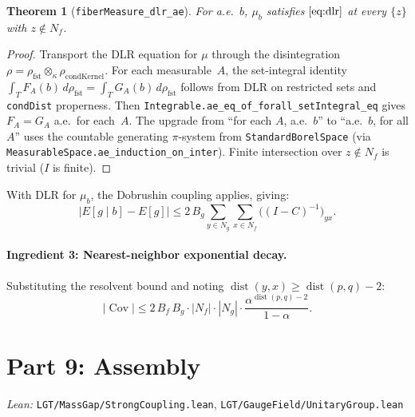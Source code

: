 \documentclass[11pt,a4paper]{article}
\newtheorem{theorem}{Theorem}
\theoremstyle{definition}
\newcommand{\Cov}{\operatorname{Cov}}
\begin{document}
\begin{theorem}[\texttt{fiberMeasure\_dlr\_ae}]
For a.e.\ $b$, $\mu_b$ satisfies $\eqref{eq:dlr}$ at every
$\{z\}$ with $z \notin N_f$.
\end{theorem}
\begin{proof}
Transport the DLR equation for $\mu$ through the disintegration
$\rho = \rho_\text{fst} \otimes_\kappa \rho_\text{condKernel}$.
For each measurable~$A$, the set-integral identity
$\int_T F_A(b)\, d\rho_\text{fst} = \int_T G_A(b)\, d\rho_\text{fst}$
follows from DLR on restricted sets and \texttt{condDist}
properness. Then
\texttt{Integrable.ae\_eq\_of\_forall\_setIntegral\_eq} gives $F_A = G_A$
a.e.\ for each~$A$. The upgrade from ``for each $A$, a.e.\ $b$'' to
``a.e.\ $b$, for all $A$'' uses the countable generating
$\pi$-system from \texttt{StandardBorelSpace}
(via \texttt{MeasurableSpace.ae\_induction\_on\_inter}).
Finite intersection over $z \notin N_f$ is trivial ($I$ is finite).
\end{proof}

With DLR for $\mu_b$, the Dobrushin coupling applies, giving:
\[
  |E[g \mid b] - E[g]|
  \leq 2\, B_g \sum_{y \in N_g} \sum_{x \in N_f}
  \bigl((I - C)^{-1}\bigr)_{yx}.
\]

\paragraph{Ingredient 3: Nearest-neighbor exponential decay.}
Substituting the resolvent bound and noting
$\operatorname{dist}(y, x) \geq \operatorname{dist}(p, q) - 2$:
\[
  |\Cov| \leq 2\, B_f\, B_g \cdot |N_f| \cdot |N_g|
  \cdot \frac{\alpha^{\operatorname{dist}(p,q) - 2}}{1 - \alpha}.
\]

\section{Part 9: Assembly}

\textit{Lean:} \texttt{LGT/MassGap/StrongCoupling.lean},
\texttt{LGT/GaugeField/UnitaryGroup.lean}

\medskip
\end{document}
